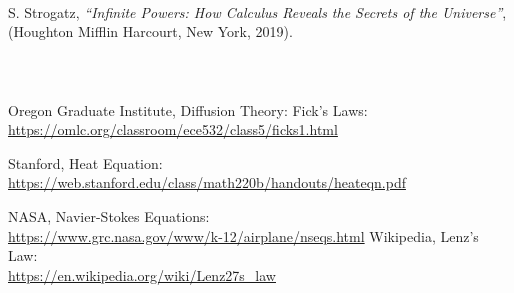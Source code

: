 \documentclass[aps,prl,reprint]{revtex4-2}
\begin{document}
\newpage
\begin{thebibliography}{9}
%

 \\
S. Strogatz, \textit{“Infinite Powers: How Calculus Reveals the Secrets of the Universe”}, (Houghton Mifflin Harcourt, New York, 2019).
%
\\\\\\\\
Oregon Graduate Institute, Diffusion Theory: Fick's Laws: \\
\href{https://omlc.org/classroom/ece532/class5/ficks1.html}{https://omlc.org/classroom/ece532/class5/ficks1.html}

Stanford, Heat Equation: \\
\href{https://web.stanford.edu/class/math220b/handouts/heateqn.pdf}{https://web.stanford.edu/class/math220b/handouts/heateqn.pdf}


NASA, Navier-Stokes Equations: \\
\href{https://www.grc.nasa.gov/www/k-12/airplane/nseqs.html}{https://www.grc.nasa.gov/www/k-12/airplane/nseqs.html}
%
Wikipedia, Lenz's Law: \\
\href{https://en.wikipedia.org/wiki/Lenz27s_law}{https://en.wikipedia.org/wiki/Lenz27s_law}


\end{thebibliography}
\end{document}
